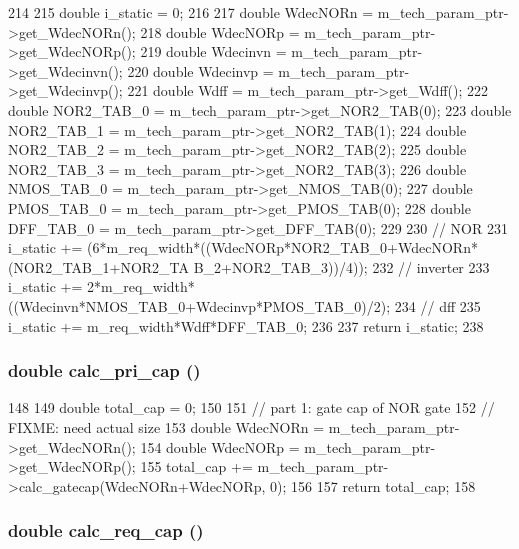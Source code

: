 \begin{DoxyCode}
214 {
215     double i_static = 0;
216 
217     double WdecNORn = m_tech_param_ptr->get_WdecNORn();
218     double WdecNORp = m_tech_param_ptr->get_WdecNORp();
219     double Wdecinvn = m_tech_param_ptr->get_Wdecinvn();
220     double Wdecinvp = m_tech_param_ptr->get_Wdecinvp();
221     double Wdff = m_tech_param_ptr->get_Wdff();
222     double NOR2_TAB_0 = m_tech_param_ptr->get_NOR2_TAB(0);
223     double NOR2_TAB_1 = m_tech_param_ptr->get_NOR2_TAB(1);
224     double NOR2_TAB_2 = m_tech_param_ptr->get_NOR2_TAB(2);
225     double NOR2_TAB_3 = m_tech_param_ptr->get_NOR2_TAB(3);
226     double NMOS_TAB_0 = m_tech_param_ptr->get_NMOS_TAB(0);
227     double PMOS_TAB_0 = m_tech_param_ptr->get_PMOS_TAB(0);
228     double DFF_TAB_0 = m_tech_param_ptr->get_DFF_TAB(0);
229 
230     // NOR
231     i_static += (6*m_req_width*((WdecNORp*NOR2_TAB_0+WdecNORn*(NOR2_TAB_1+NOR2_TA
      B_2+NOR2_TAB_3))/4));
232     // inverter
233     i_static += 2*m_req_width*((Wdecinvn*NMOS_TAB_0+Wdecinvp*PMOS_TAB_0)/2);
234     // dff
235     i_static += m_req_width*Wdff*DFF_TAB_0;
236 
237     return i_static;
238 }
\end{DoxyCode}
\hypertarget{classRRArbiter_ab7379d0e829c19b19c699f8bca018b9d}{
\subsubsection[{calc\_\-pri\_\-cap}]{\setlength{\rightskip}{0pt plus 5cm}double calc\_\-pri\_\-cap ()}}
\label{classRRArbiter_ab7379d0e829c19b19c699f8bca018b9d}



\begin{DoxyCode}
148 {
149     double total_cap = 0;
150 
151     // part 1: gate cap of NOR gate
152     // FIXME: need actual size
153     double WdecNORn = m_tech_param_ptr->get_WdecNORn();
154     double WdecNORp = m_tech_param_ptr->get_WdecNORp();
155     total_cap += m_tech_param_ptr->calc_gatecap(WdecNORn+WdecNORp, 0);
156 
157     return total_cap;
158 }
\end{DoxyCode}
\hypertarget{classRRArbiter_ad328bcd6c4435aff24a79afd9ac8b978}{
\subsubsection[{calc\_\-req\_\-cap}]{\setlength{\rightskip}{0pt plus 5cm}double calc\_\-req\_\-cap ()}}
\label{classRRArbiter_ad328bcd6c4435aff24a79afd9ac8b978}



